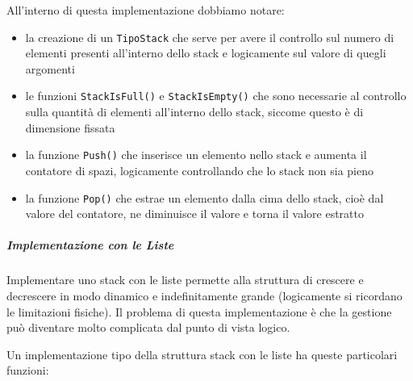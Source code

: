 \documentclass[
  paper=a4,
  oneside  ,captions=tableheading
]{scrbook}
\newcommand{\passthrough}[1]{#1}
\begin{document}
All'interno di questa implementazione dobbiamo notare:

\begin{itemize}
\item
  la creazione di un \passthrough{\lstinline!TipoStack!} che serve per
  avere il controllo sul numero di elementi presenti all'interno dello
  stack e logicamente sul valore di quegli argomenti
\item
  le funzioni \passthrough{\lstinline!StackIsFull()!} e
  \passthrough{\lstinline!StackIsEmpty()!} che sono necessarie al
  controllo sulla quantità di elementi all'interno dello stack, siccome
  questo è di dimensione fissata
\item
  la funzione \passthrough{\lstinline!Push()!} che inserisce un elemento
  nello stack e aumenta il contatore di spazi, logicamente controllando
  che lo stack non sia pieno
\item
  la funzione \passthrough{\lstinline!Pop()!} che estrae un elemento
  dalla cima dello stack, cioè dal valore del contatore, ne diminuisce
  il valore e torna il valore estratto
\end{itemize}

\hypertarget{implementazione-con-le-liste}{%
\subparagraph{\texorpdfstring{Implementazione con le
\emph{Liste}}{Implementazione con le Liste}}\label{implementazione-con-le-liste}}

Implementare uno stack con le liste permette alla struttura di crescere
e decrescere in modo dinamico e indefinitamente grande (logicamente si
ricordano le limitazioni fisiche). Il problema di questa implementazione
è che la gestione può diventare molto complicata dal punto di vista
logico.

Un implementazione tipo della struttura stack con le liste ha queste
particolari funzioni:
\end{document}
